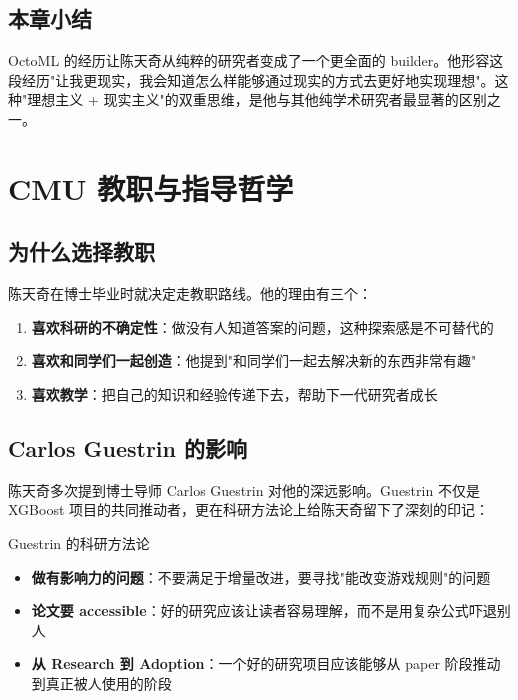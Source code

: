 \documentclass[a4paper]{article}
\begin{document}
\subsection{本章小结}

OctoML 的经历让陈天奇从纯粹的研究者变成了一个更全面的 builder。他形容这段经历"让我更现实，我会知道怎么样能够通过现实的方式去更好地实现理想"。这种"理想主义 + 现实主义"的双重思维，是他与其他纯学术研究者最显著的区别之一。

\section{CMU 教职与指导哲学}

\subsection{为什么选择教职}

陈天奇在博士毕业时就决定走教职路线。他的理由有三个：

\begin{enumerate}
\item \textbf{喜欢科研的不确定性}：做没有人知道答案的问题，这种探索感是不可替代的
\item \textbf{喜欢和同学们一起创造}：他提到"和同学们一起去解决新的东西非常有趣"
\item \textbf{喜欢教学}：把自己的知识和经验传递下去，帮助下一代研究者成长
\end{enumerate}

\subsection{Carlos Guestrin 的影响}

陈天奇多次提到博士导师 Carlos Guestrin 对他的深远影响。Guestrin 不仅是 XGBoost 项目的共同推动者，更在科研方法论上给陈天奇留下了深刻的印记：

\begin{knowledgebox}{Guestrin 的科研方法论}
\begin{itemize}
\item \textbf{做有影响力的问题}：不要满足于增量改进，要寻找"能改变游戏规则"的问题
\item \textbf{论文要 accessible}：好的研究应该让读者容易理解，而不是用复杂公式吓退别人
\item \textbf{从 Research 到 Adoption}：一个好的研究项目应该能够从 paper 阶段推动到真正被人使用的阶段
\end{itemize}
\end{knowledgebox}
\end{document}
